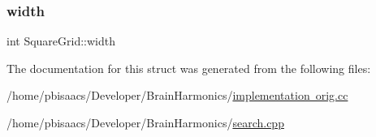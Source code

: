 \subsubsection{\texorpdfstring{width}{width}}
{\footnotesize\ttfamily int Square\+Grid\+::width}



The documentation for this struct was generated from the following files\+:\begin{DoxyCompactItemize}
\item 
/home/pbisaacs/\+Developer/\+Brain\+Harmonics/\mbox{\hyperlink{implementation_01orig_8cc}{implementation orig.\+cc}}\item 
/home/pbisaacs/\+Developer/\+Brain\+Harmonics/\mbox{\hyperlink{search_8cpp}{search.\+cpp}}\end{DoxyCompactItemize}
